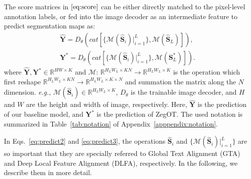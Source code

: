\documentclass[nohyperref]{article}
\newcommand{\bs}{\boldsymbol}
\newcommand{\asty}{{\mathbf{Y}^*}}
\newcommand{\mbf}{\mathbf}
\theoremstyle{plain}
\theoremstyle{definition}
\theoremstyle{remark}
\begin{document}
{The score matrices in $\eqref{eq:score}$ can be either directly matched to the pixel-level annotation labels, or %
fed into the image decoder as an intermediate feature to predict segmentation maps as:
\begin{align}
\mbf{\hat Y} =  D_{\theta}(cat[\{\mathcal{M}(\bs{\hat S}_i)|_{i=1}^{L}\}, \mathcal{M}(\bs{\hat S}_L)]),  \label{eq:predict2}\\
\asty = D_{\theta}(cat[\{\mathcal{M}(\bs{\hat S}_i)|_{i=1}^{L}\},  \mathcal{M}(\bs{S}^{*}_L)]).
 \label{eq:predict3}
\end{align}
where $\mbf{\hat Y}, \asty \in \mathbb{R}^{HW \times K}$ and
$\mathcal{M}$: $\mathbb{R}^{H_LW_L \times KN} \rightarrow \mathbb{R}^{H_L W_L \times K}$ is the operation which first reshape $\mathbb{R}^{H_L W_L \times KN} \rightarrow \mathbb{R}^{H_L W_L \times K \times N}$ and summation the matrix along the $N$ dimension. \textit{e.g.,} $\mathcal{M}(\bs{\hat S}_i) \in \mathbb{R}^{H_L W_L\times K}$, $D_{\theta}$ is the trainable image decoder, and $H$ and $W$ are the height and width of image, respectively. 
}
Here, %
$\mbf{\hat Y}$ is the prediction of our baseline model, and $\asty$ is the prediction of ZegOT.
The used notation is summarized in Table~\ref{tab:notation} of Appendix~\ref{apppendix:notation}.


In Eqs.~\eqref{eq:predict2} and \eqref{eq:predict3},
the operations $\bs{\hat S}_i$ and $\{\mathcal{M}(\bs{\hat S}_i)|_{i=1}^{L}\}$ 
are so important that they are specially referred to Global Text Alignment (GTA)
and Deep Local Feature Alignment (DLFA), respectively.
In the following, we describe them in more detail.
    
\end{document}
